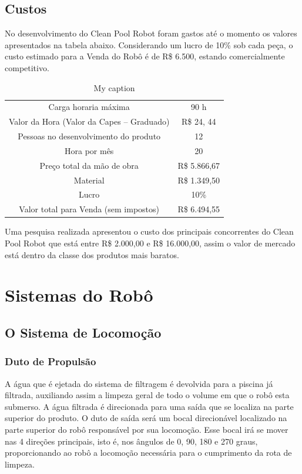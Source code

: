 \section{Custos}
No desenvolvimento do Clean Pool Robot foram gastos até o momento os valores apresentados na tabela abaixo. Considerando um lucro de 10\% sob cada peça, o custo estimado para a Venda do Robô é de R\$ 6.500, estando comercialmente competitivo.
\begin{table}[h]
\centering
\caption{My caption}
\label{my-label}
\begin{tabular}{@{}cc@{}}
Carga horaria máxima                      & 90 h         \\
Valor da Hora (Valor da Capes – Graduado) & R\$ 24, 44   \\
Pessoas no desenvolvimento do produto     & 12           \\
Hora por mês                              & 20           \\
Preço total da mão de obra                & R\$ 5.866,67 \\
Material                                  & R\$ 1.349,50 \\
Lucro                                     & 10\%         \\ \midrule
Valor total para Venda (sem impostos)     & R\$ 6.494,55
\end{tabular}
\end{table}

Uma pesquisa realizada apresentou o custo dos principais concorrentes do Clean Pool Robot que está entre R\$ 2.000,00 e R\$ 16.000,00, assim o valor de mercado está dentro da classe dos produtos mais baratos.

\chapter{Sistemas do Robô}
\section{O Sistema de Locomoção}
\subsection{Duto de Propulsão}
A água que é ejetada do sistema de filtragem é devolvida para a piscina já filtrada, auxiliando assim a limpeza geral de todo o volume em que o robô esta submerso. A água filtrada é direcionada para uma saída que se localiza na parte superior do produto. O duto de saída será um bocal direcionável localizado na parte superior do robô responsável por sua locomoção. Esse bocal irá se mover nas 4 direções principais, isto é, nos ângulos de 0, 90, 180 e 270 graus, proporcionando ao robô a locomoção necessária para o cumprimento da rota de limpeza.


